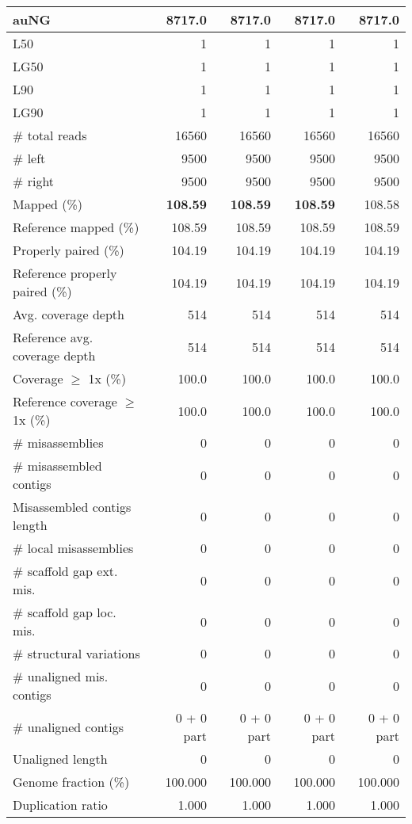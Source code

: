 \documentclass[12pt,a4paper]{article}
\begin{document}
\begin{table}[ht]
\begin{center}
\begin{tabular}{|l*{4}{|r}|}
auNG & 8717.0 & 8717.0 & 8717.0 & 8717.0 \\ \hline
L50 & 1 & 1 & 1 & 1 \\ \hline
LG50 & 1 & 1 & 1 & 1 \\ \hline
L90 & 1 & 1 & 1 & 1 \\ \hline
LG90 & 1 & 1 & 1 & 1 \\ \hline
\# total reads & 16560 & 16560 & 16560 & 16560 \\ \hline
\# left & 9500 & 9500 & 9500 & 9500 \\ \hline
\# right & 9500 & 9500 & 9500 & 9500 \\ \hline
Mapped (\%) & {\bf 108.59} & {\bf 108.59} & {\bf 108.59} & 108.58 \\ \hline
Reference mapped (\%) & 108.59 & 108.59 & 108.59 & 108.59 \\ \hline
Properly paired (\%) & 104.19 & 104.19 & 104.19 & 104.19 \\ \hline
Reference properly paired (\%) & 104.19 & 104.19 & 104.19 & 104.19 \\ \hline
Avg. coverage depth & 514 & 514 & 514 & 514 \\ \hline
Reference avg. coverage depth & 514 & 514 & 514 & 514 \\ \hline
Coverage $\geq$ 1x (\%) & 100.0 & 100.0 & 100.0 & 100.0 \\ \hline
Reference coverage $\geq$ 1x (\%) & 100.0 & 100.0 & 100.0 & 100.0 \\ \hline
\# misassemblies & 0 & 0 & 0 & 0 \\ \hline
\# misassembled contigs & 0 & 0 & 0 & 0 \\ \hline
Misassembled contigs length & 0 & 0 & 0 & 0 \\ \hline
\# local misassemblies & 0 & 0 & 0 & 0 \\ \hline
\# scaffold gap ext. mis. & 0 & 0 & 0 & 0 \\ \hline
\# scaffold gap loc. mis. & 0 & 0 & 0 & 0 \\ \hline
\# structural variations & 0 & 0 & 0 & 0 \\ \hline
\# unaligned mis. contigs & 0 & 0 & 0 & 0 \\ \hline
\# unaligned contigs & 0 + 0 part & 0 + 0 part & 0 + 0 part & 0 + 0 part \\ \hline
Unaligned length & 0 & 0 & 0 & 0 \\ \hline
Genome fraction (\%) & 100.000 & 100.000 & 100.000 & 100.000 \\ \hline
Duplication ratio & 1.000 & 1.000 & 1.000 & 1.000 \\ \hline

\end{tabular}
\end{center}
\end{table}
\end{document}
